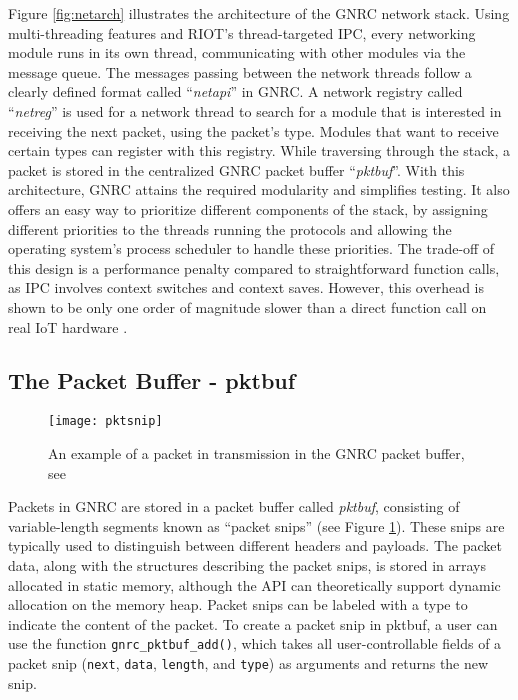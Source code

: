   Figure \ref{fig:netarch} illustrates the architecture of the GNRC network stack. Using multi-threading
  features and RIOT's thread-targeted IPC, every networking module runs in its own thread, communicating
  with other modules via the message queue. The messages passing between the network threads follow 
  a clearly defined format called ``\textit{netapi}'' in GNRC. A network registry called ``\textit{netreg}''
  is used for a network thread to search for a module that is interested in receiving the next packet, using
  the packet's type. Modules that want to receive certain types can register with this registry. While
  traversing through the stack, a packet is stored in the centralized GNRC packet buffer ``\textit{pktbuf}''.
  With this architecture, GNRC attains the required modularity and simplifies testing. 
  It also offers an easy way to prioritize different components of the stack, by assigning different 
  priorities to the threads running the protocols and allowing the operating system’s process 
  scheduler  to handle these priorities. The trade-off of this design is a performance penalty compared to
  straightforward function calls, as IPC involves context switches and context saves. However, this overhead
  is shown to be only one order of magnitude slower than a direct function call on real IoT hardware \cite[section 4.1]{oldwines}.

\subsection{The Packet Buffer - pktbuf}
  \begin{figure}[h]
    \centering
    \texttt{[image: pktsnip]}
    \caption{An example of a packet in transmission in the GNRC packet buffer, see \cite[p.~22]{gnrc}}
    \label{fig:pktsnip}
  \end{figure}

  Packets in GNRC are stored in a packet buffer called \textit{pktbuf}, consisting of variable-length 
  segments known as “packet snips” (see Figure \ref{fig:pktsnip}). These snips are typically used 
  to distinguish between different headers and payloads. The packet data, along with the structures 
  describing the packet snips, is stored in arrays allocated in static memory, although the API can 
  theoretically support dynamic allocation on the memory heap. Packet snips can be labeled with a 
  type to indicate the content of the packet. To create a packet snip in pktbuf, a user can 
  use the function \texttt{gnrc{\_}pktbuf{\_}add()}, which takes all user-controllable fields of a packet snip 
  (\texttt{next}, \texttt{data}, \texttt{length}, and \texttt{type}) as arguments and returns the new snip.

